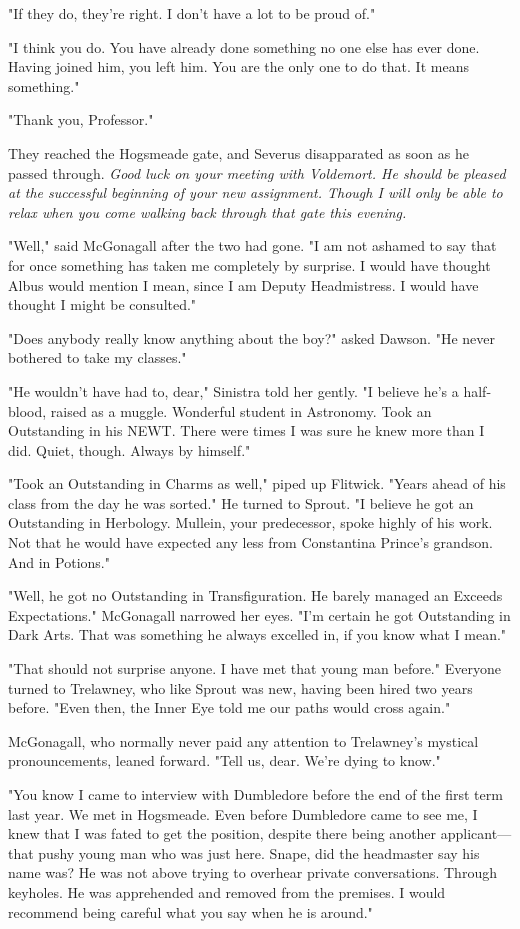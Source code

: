 "If they do, they're right. I don't have a lot to be proud of."

"I think you do. You have already done something no one else has ever done. Having joined him, you left him. You are the only one to do that. It means something."

"Thank you, Professor."

They reached the Hogsmeade gate, and Severus disapparated as soon as he passed through. \emph{Good luck on your meeting with Voldemort. He should be pleased at the successful beginning of your new assignment. Though I will only be able to relax when you come walking back through that gate this evening.}

"Well," said McGonagall after the two had gone. "I am not ashamed to say that for once something has taken me completely by surprise. I would have thought Albus would mention{\el} I mean, since I am Deputy Headmistress. I would have thought I might be consulted."

"Does anybody really know anything about the boy?" asked Dawson. "He never bothered to take my classes."

"He wouldn't have had to, dear," Sinistra told her gently. "I believe he's a half-blood, raised as a muggle. Wonderful student in Astronomy. Took an Outstanding in his NEWT. There were times I was sure he knew more than I did. Quiet, though. Always by himself."

"Took an Outstanding in Charms as well," piped up Flitwick. "Years ahead of his class from the day he was sorted." He turned to Sprout. "I believe he got an Outstanding in Herbology. Mullein, your predecessor, spoke highly of his work. Not that he would have expected any less from Constantina Prince's grandson. And in Potions."

"Well, he got no Outstanding in Transfiguration. He barely managed an Exceeds Expectations." McGonagall narrowed her eyes. "I'm certain he got Outstanding in Dark Arts. That was something he always excelled in, if you know what I mean."

"That should not surprise anyone. I have met that young man before." Everyone turned to Trelawney, who like Sprout was new, having been hired two years before. "Even then, the Inner Eye told me our paths would cross again."

McGonagall, who normally never paid any attention to Trelawney's mystical pronouncements, leaned forward. "Tell us, dear. We're dying to know."

"You know I came to interview with Dumbledore before the end of the first term last year. We met in Hogsmeade. Even before Dumbledore came to see me, I knew that I was fated to get the position, despite there being another applicant—that pushy young man who was just here. Snape, did the headmaster say his name was? He was not above trying to overhear private conversations. Through keyholes. He was apprehended and removed from the premises. I would recommend being careful what you say when he is around."

